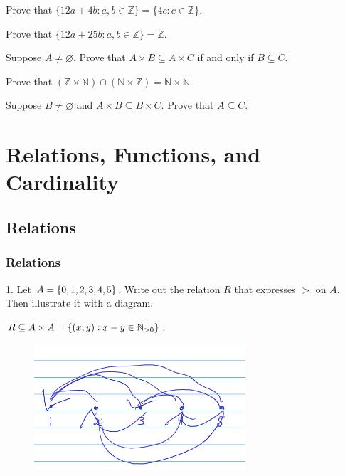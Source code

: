 \documentclass[openany, 12pt]{book}
\begin{document}
\begin{exercise}{}{}
	Prove that $\{12 a+4 b: a, b \in \mathbb{Z}\}=\{4 c: c \in
		\mathbb{Z}\}$.
\end{exercise}

\begin{exercise}{}{}
	Prove that $\{12 a+25 b: a, b \in \mathbb{Z}\}=\mathbb{Z}$.
\end{exercise}

\begin{exercise}{}{}
	Suppose $A \neq \varnothing$. Prove that $A \times B \subseteq A \times
		C$ if and only if $B \subseteq C$.
\end{exercise}

\begin{exercise}{}{}
	Prove that $(\mathbb{Z} \times \mathbb{N}) \cap(\mathbb{N} \times
		\mathbb{Z})=\mathbb{N} \times \mathbb{N}$.
\end{exercise}

\begin{exercise}{}{}
	Suppose $B \neq \varnothing$ and $A \times B \subseteq B \times C$.
	Prove that $A \subseteq C$.
\end{exercise}

\part{Relations, Functions, and Cardinality}
\setcounter{chapter}{10}
\chapter{Relations}
\section{Relations}
\begin{exercise}{}{}
	{1. Let $A=\{0,1,2,3,4,5\}$. Write out the relation $R$ that expresses $>$ on $A$. Then illustrate it with a diagram.}
	\begin{alist}
		\item $R\subseteq A\times A = \{(x, y): x-y \in \mathbb{N}_{>0}\}$.
	\end{alist}
\end{exercise}
\begin{figure}
	\centering
	\includegraphics[width=0.7\textwidth]{images/11-01-01.png}
\end{figure}
\end{document}
